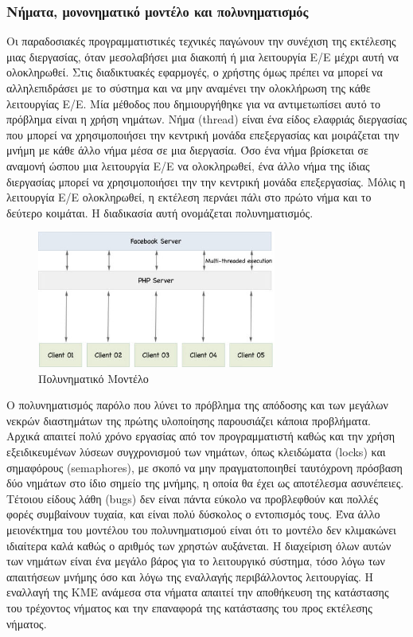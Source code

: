 \subsubsection{Νήματα, μονονηματικό μοντέλο και πολυνηματισμός}

		Οι παραδοσιακές προγραμματιστικές τεχνικές παγώνουν την συνέχιση της εκτέλεσης μιας διεργασίας, όταν μεσολαβήσει μια διακοπή ή μια λειτουργία E/E μέχρι αυτή να ολοκληρωθεί. Στις διαδικτυακές εφαρμογές, ο χρήστης όμως πρέπει να μπορεί να αλληλεπιδράσει με το σύστημα και να μην αναμένει την ολοκλήρωση της κάθε λειτουργίας Ε/Ε. Μία μέθοδος που δημιουργήθηκε για να αντιμετωπίσει αυτό το πρόβλημα είναι η χρήση νημάτων. Νήμα (thread) είναι ένα είδος ελαφριάς διεργασίας που μπορεί να χρησιμοποιήσει την κεντρική μονάδα επεξεργασίας και μοιράζεται την μνήμη με κάθε άλλο νήμα μέσα σε μια διεργασία. Όσο ένα νήμα βρίσκεται σε αναμονή ώσπου μια λειτουργία Ε/Ε να ολοκληρωθεί, ένα άλλο νήμα της ίδιας διεργασίας μπορεί να χρησιμοποιήσει την την κεντρική μονάδα επεξεργασίας. Μόλις η λειτουργία Ε/Ε ολοκληρωθεί, η εκτέλεση περνάει πάλι στο πρώτο νήμα και το δεύτερο κοιμάται. Η διαδικασία αυτή ονομάζεται πολυνηματισμός.
		
		
	\begin{figure}[h]
	    \centering
	    \includegraphics[width=0.7\textwidth]{multi-threaded.jpg}
	    \caption{Πολυνηματικό Μοντέλο}
	    \label{fig:multi}
	\end{figure}
	
	
	
		 Ο πολυνηματισμός παρόλο που λύνει το πρόβλημα της απόδοσης και των μεγάλων νεκρών διαστημάτων της πρώτης υλοποίησης παρουσιάζει κάποια προβλήματα. Αρχικά απαιτεί πολύ χρόνο εργασίας από τον προγραμματιστή καθώς και την χρήση εξειδικευμένων λύσεων συγχρονισμού των νημάτων, όπως κλειδώματα (locks) και σημαφόρους (semaphores), με σκοπό να μην πραγματοποιηθεί ταυτόχρονη πρόσβαση δύο νημάτων στο ίδιο σημείο της μνήμης, η οποία θα έχει ως αποτέλεσμα ασυνέπειες.  \cite{silberschatz} Τέτοιου είδους λάθη (bugs) δεν είναι πάντα εύκολο να προβλεφθούν και πολλές φορές συμβαίνουν τυχαία, και είναι πολύ δύσκολος ο εντοπισμός τους. Ένα άλλο μειονέκτημα του μοντέλου του πολυνηματισμού είναι ότι το μοντέλο  δεν κλιμακώνει ιδιαίτερα καλά καθώς ο αριθμός των χρηστών αυξάνεται. Η διαχείριση όλων αυτών των νημάτων είναι ένα μεγάλο βάρος για το λειτουργικό σύστημα, τόσο λόγω των απαιτήσεων μνήμης όσο και λόγω της εναλλαγής περιβάλλοντος λειτουργίας. Η εναλλαγή της ΚΜΕ ανάμεσα στα νήματα απαιτεί την αποθήκευση της κατάστασης του τρέχοντος νήματος και την επαναφορά της κατάστασης του προς εκτέλεσης νήματος. 
		
